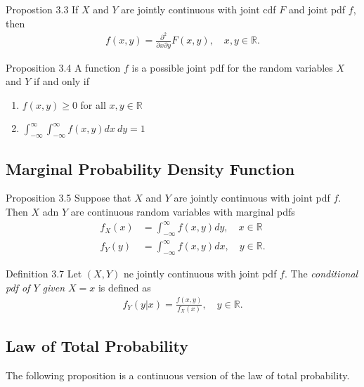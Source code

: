 \begin{boks}{Propostion 3.3}
If $X$ and $Y$ are jointly continuous with joint cdf $F$ and joint pdf $f$, then
\begin{align*}
    f(x, y) = \frac{\partial^2}{\partial x \partial y} F(x,y), \quad x,y \in \mathbb{R}.
\end{align*}
\end{boks}

\begin{boks}{Proposition 3.4}
A function $f$ is a possible joint pdf for the random variables $X$ and $Y$ if and only if
\begin{enumerate}
    \item $f(x, y) \geq 0$ for all $x,y \in \mathbb{R}$
    \item $\int_{-\infty}^\infty \int_{-\infty}^\infty f(x,y)dx\  dy = 1$
\end{enumerate}
\end{boks}
\newpage
\subsection{Marginal Probability Density Function}

\begin{boks}{Proposition 3.5}
Suppose that $X$ and $Y$ are jointly continuous with joint pdf $f$. Then $X$ adn $Y$ are continuous random variables with marginal pdfs
\begin{align*}
    f_X(x) &= \int_{-\infty}^\infty f(x, y) dy, \quad x\in\mathbb{R} \\
    f_Y(y) &= \int_{-\infty}^\infty f(x,y) dx, \quad y\in\mathbb{R}.
\end{align*}
\end{boks}

\begin{boks}{Definition 3.7}
Let $(X, Y)$ ne jointly continuous with joint pdf $f$. The \textit{conditional pdf of $Y$ given $X=x$} is defined as
\begin{align*}
    f_Y(y|x) = \frac{f(x,y)}{f_X(x)}, \quad y\in\mathbb{R}.
\end{align*}
\end{boks}
\vspace{-5mm}
\subsection{Law of Total Probability}
The following proposition is a continuous version of the law of total probability.

